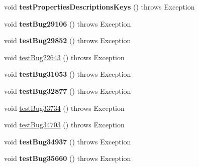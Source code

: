 \begin{DoxyCompactItemize}
void {\bfseries test\+Properties\+Descriptions\+Keys} ()  throws Exception 
\item 
\mbox{\label{classtestsuite_1_1regression_1_1_connection_regression_test_a767a29b2ab38b79b89df97f650fd78cb}} 
void {\bfseries test\+Bug29106} ()  throws Exception 
\item 
\mbox{\label{classtestsuite_1_1regression_1_1_connection_regression_test_acfd6776a367a9af1afbd3e06b63801f1}} 
void {\bfseries test\+Bug29852} ()  throws Exception 
\item 
void \mbox{\hyperlink{classtestsuite_1_1regression_1_1_connection_regression_test_aa286edfd17b719033e82cd5b359f2e4f}{test\+Bug22643}} ()  throws Exception 
\item 
\mbox{\label{classtestsuite_1_1regression_1_1_connection_regression_test_acf494665c109b5683c2c91f5c5e65b5a}} 
void {\bfseries test\+Bug31053} ()  throws Exception 
\item 
\mbox{\label{classtestsuite_1_1regression_1_1_connection_regression_test_a3e6e2512ed4fda21a7f3f97e77055134}} 
void {\bfseries test\+Bug32877} ()  throws Exception 
\item 
void \mbox{\hyperlink{classtestsuite_1_1regression_1_1_connection_regression_test_a06827fd6f7095ca49c066279b2dd41a6}{test\+Bug33734}} ()  throws Exception 
\item 
void \mbox{\hyperlink{classtestsuite_1_1regression_1_1_connection_regression_test_ab8a5be5d0f3c870006614f5aa94dd750}{test\+Bug34703}} ()  throws Exception 
\item 
\mbox{\label{classtestsuite_1_1regression_1_1_connection_regression_test_a9db30b6a8805c65b9a39df8a682d12af}} 
void {\bfseries test\+Bug34937} ()  throws Exception 
\item 
\mbox{\label{classtestsuite_1_1regression_1_1_connection_regression_test_ab72404e11448db0f3fe1d4ecf3d5efe1}} 
void {\bfseries test\+Bug35660} ()  throws Exception 
\item 

\end{DoxyCompactItemize}

